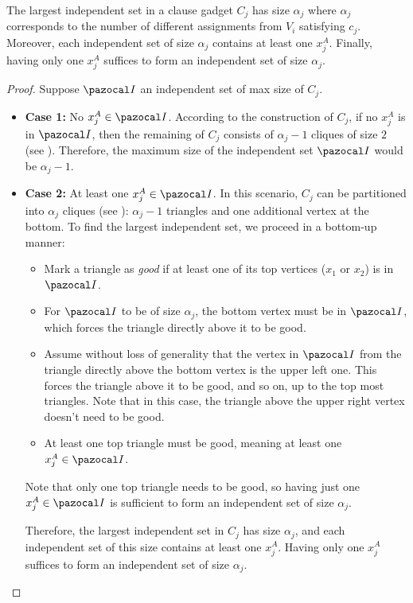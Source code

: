 \begin{lemma}
    \label{lemma:clause-gadget-indset}
    The largest independent set in a clause gadget $C_j$ has size $\alpha_j$ where $\alpha_j$ corresponds to the number of different assignments from $V_i$ satisfying $c_j$. Moreover, each independent set of size $\alpha_j$ contains at least one $x_j^A$. Finally, having only one $x_j^A$ suffices to form an independent set of size $\alpha_j$.
\end{lemma}

\begin{proof}
    Suppose $\I$ an independent set of max size of $C_j$.
    \begin{itemize}
        \item \textbf{Case 1:} No $x_j^A \in \I$. According to the construction of $C_j$, if no $x_j^A$ is in $\I$, then the remaining of $C_j$ consists of $\alpha_j - 1$ cliques of size $2$ (see ). Therefore, the maximum size of the independent set $\I$ would be $\alpha_j - 1$.
        \item \textbf{Case 2:} At least one $x_j^A \in \I$. In this scenario, $C_j$ can be partitioned into $\alpha_j$ cliques (see ): $\alpha_j - 1$ triangles and one additional vertex at the bottom. To find the largest independent set, we proceed in a bottom-up manner:
        \begin{itemize}
            \item Mark a triangle as \textit{good} if at least one of its top vertices ($x_1$ or $x_2$) is in $\I$.
            \item For $\I$ to be of size $\alpha_j$, the bottom vertex must be in $\I$, which forces the triangle directly above it to be good.
            \item Assume without loss of generality that the vertex in $\I$ from the triangle directly above the bottom vertex is the upper left one. This forces the triangle above it to be good, and so on, up to the top most triangles. Note that in this case, the triangle above the upper right vertex doesn't need to be good.
            \item At least one top triangle must be good, meaning at least one $x_j^A \in \I$.
        \end{itemize}
        
        \medskip
        
        Note that only one top triangle needs to be good, so having just one $x_j^A \in \I$ is sufficient to form an independent set of size $\alpha_j$.
        
        \medskip

        Therefore, the largest independent set in $C_j$ has size $\alpha_j$, and each independent set of this size contains at least one $x_j^A$. Having only one $x_j^A$ suffices to form an independent set of size $\alpha_j$.
    \end{itemize}
\end{proof}

